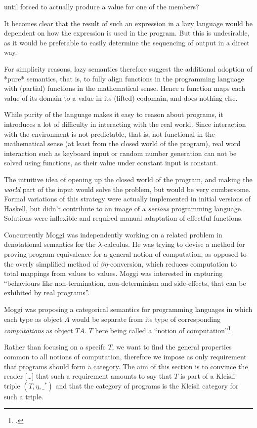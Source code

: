 until forced to actually produce a value for one of the members?

It becomes clear that the result of such an expression in a lazy
language would be dependent on how the expression is used in the
program. But this is undesirable, as it would be preferable to easily
determine the sequencing of output in a direct way.

For simplicity reasons, lazy semantics therefore suggest the additional
adoption of *pure* semantics, that is, to fully align functions in the
programming language with (partial) functions in the mathematical sense.
Hence a function maps each value of its domain to a value in its
(lifted) codomain, and does nothing else.

While purity of the language makes it easy to reason about programs, it
introduces a lot of difficulty in interacting with the real world. Since
interaction with the environment is not predictable, that is, not
functional in the mathematical sense (at least from the closed world of
the program), real word interaction such as keyboard input or random
number generation can not be solved using functions, as their value
under constant input is constant.

The intuitive idea of opening up the closed world of the program, and
making the \emph{world} part of the input would solve the problem, but
would be very cumbersome. Formal variations of this strategy were
actually implemented in initial versions of Haskell, but didn't
contribute to an image of a \emph{serious} programming language.
Solutions were inflexible and required manual adaptation of effectful
functions.

Concurrently Moggi was independently working on a related problem in
denotational semantics for the $\lambda$-calculus. He was trying to
devise a method for proving program equivalence for a general notion of
computation, as opposed to the overly simplified method of
$\beta\eta$-conversion, which reduces computation to total mappings from
values to values. Moggi was interested in capturing ``behaviours like
non-termination, non-determinism and side-effects, that can be exhibited
by real programs''\cite[p. 1]{moggi-91}.

Moggi was proposing a categorical semantics for programming languages in
which each type as object $A$ would be separate from its type of
corresponding \emph{computations} as object $TA$. $T$ here being called
a ``notion of computation''\footcite[p. 3]{moggi-91}.

\begin{blockquote}
Rather than focusing on a specifc $T$, we want to find the general
properties common to all notions of computation, therefore we impose as
only requirement that programs should form a category. The aim of this
section is to convince the reader [\ldots] that such a requirement
amounts to say that $T$ is part of a Kleisli triple $(T,\eta,\_^\ast)$
and that the category of programs is the Kleisli category for such a
triple.
\end{blockquote}

